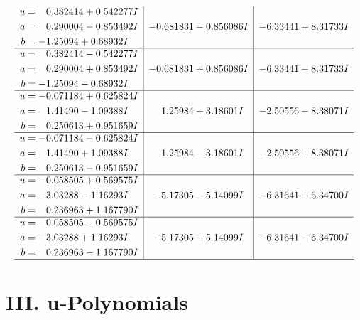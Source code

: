 \documentclass[1p]{elsarticle_modified}
\theoremstyle{definition}
\begin{document}
$$\begin{array}{c|c|c}
\begin{aligned}
u &= \phantom{-}0.382414 + 0.542277 I \\
a &= \phantom{-}0.290004 - 0.853492 I \\
b &= -1.25094 + 0.68932 I\end{aligned}
 & -0.681831 - 0.856086 I & -6.33441 + 8.31733 I \\ \hline\begin{aligned}
u &= \phantom{-}0.382414 - 0.542277 I \\
a &= \phantom{-}0.290004 + 0.853492 I \\
b &= -1.25094 - 0.68932 I\end{aligned}
 & -0.681831 + 0.856086 I & -6.33441 - 8.31733 I \\ \hline\begin{aligned}
u &= -0.071184 + 0.625824 I \\
a &= \phantom{-}1.41490 - 1.09388 I \\
b &= \phantom{-}0.250613 + 0.951659 I\end{aligned}
 & \phantom{-}1.25984 + 3.18601 I & -2.50556 - 8.38071 I \\ \hline\begin{aligned}
u &= -0.071184 - 0.625824 I \\
a &= \phantom{-}1.41490 + 1.09388 I \\
b &= \phantom{-}0.250613 - 0.951659 I\end{aligned}
 & \phantom{-}1.25984 - 3.18601 I & -2.50556 + 8.38071 I \\ \hline\begin{aligned}
u &= -0.058505 + 0.569575 I \\
a &= -3.03288 - 1.16293 I \\
b &= \phantom{-}0.236963 + 1.167790 I\end{aligned}
 & -5.17305 - 5.14099 I & -6.31641 + 6.34700 I \\ \hline\begin{aligned}
u &= -0.058505 - 0.569575 I \\
a &= -3.03288 + 1.16293 I \\
b &= \phantom{-}0.236963 - 1.167790 I\end{aligned}
 & -5.17305 + 5.14099 I & -6.31641 - 6.34700 I\\
 \hline 
 \end{array}$$\newpage
\newpage\renewcommand{\arraystretch}{1}
\centering \section*{ III. u-Polynomials}
\end{document}
